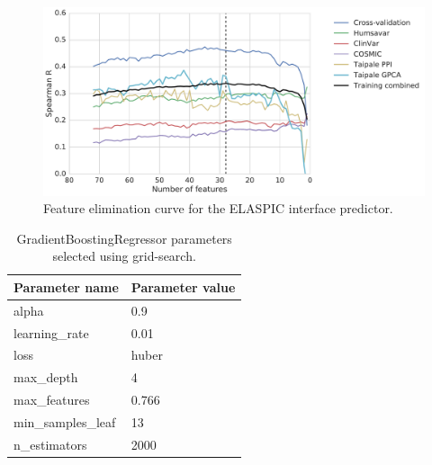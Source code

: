 \begin{figure}[!htb]
	\includegraphics[width=0.9\linewidth]{static/elaspic_training_set/machine_learning/feature_elimination_interface.pdf}
	\caption{Feature elimination curve for the ELASPIC interface predictor.}
	\label{fig:feature_elimination_interface}
\end{figure}


\clearpage
\begin{table}[!htb]
	\centering
	\caption[Interface predictor parameters.]{GradientBoostingRegressor parameters selected using grid-search.}
	\label{tab:interface_parameters}
	\begin{tabular}{ l | l }
		\toprule
		Parameter name     & Parameter value \\
		\midrule
		alpha              & 0.9             \\
		learning\_rate     & 0.01            \\
		loss               & huber           \\
		max\_depth         & 4               \\
		max\_features      & 0.766           \\
		min\_samples\_leaf & 13              \\
		n\_estimators      & 2000            \\
		\bottomrule
	\end{tabular}
\end{table}


